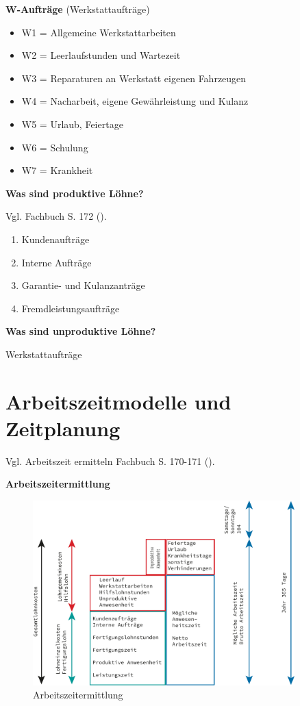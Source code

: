 \textbf{W-Aufträge} (Werkstattaufträge)

\begin{itemize}
\item
  W1 = Allgemeine Werkstattarbeiten
\item
  W2 = Leerlaufstunden und Wartezeit
\item
  W3 = Reparaturen an Werkstatt eigenen Fahrzeugen
\item
  W4 = Nacharbeit, eigene Gewährleistung und Kulanz
\item
  W5 = Urlaub, Feiertage
\item
  W6 = Schulung
\item
  W7 = Krankheit
\end{itemize}

\textbf{Was sind produktive Löhne?}

Vgl. Fachbuch S. 172 (\textcite{heiser:2017:betriebsfuhrung}).

\begin{enumerate}
\item
  Kundenaufträge
\item
  Interne Aufträge
\item
  Garantie- und Kulanzanträge
\item
  Fremdleistungsaufträge
\end{enumerate}

\textbf{Was sind unproduktive Löhne?}

Werkstattaufträge

\newpage

\section{Arbeitszeitmodelle und
Zeitplanung}\label{arbeitszeitmodelle-und-zeitplanung}

Vgl. Arbeitszeit ermitteln Fachbuch S. 170-171
(\textcite{heiser:2017:betriebsfuhrung}).

\textbf{Arbeitszeitermittlung}

\begin{figure}[!ht]%
\centering
\includegraphics[width=0.9\textwidth]{images/Skizze/Arbeitszeitermittlung.pdf}
\caption{Arbeitszeitermittlung}
\end{figure}

